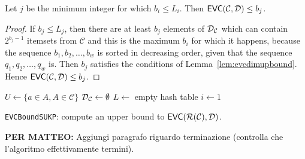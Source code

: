 \begin{lemma}\label{lem:sukpevc}
  Let $j$ be the minimum integer for which $b_i\le L_i$. Then
  $\mathsf{EVC}(\mathcal{C},{\cal D})\le b_j$.
\end{lemma}
\begin{proof}
  If $b_j\le L_j$, then there are at least $b_j$ elements of ${\cal D}_\mathcal{C}$
  which can contain $2^{b_j-1}$ itemsets from $\mathcal{C}$ and this is the
  maximum $b_i$ for which it happens, because the sequence $b_1,b_2,\dotsc,b_w$
  is sorted in decreasing order, given that the sequence $q_1,q_2,\dotsc,q_w$
  is. Then $b_j$ satisfies the conditions of Lemma~\ref{lem:evcdimupbound}.
  Hence $\mathsf{EVC}(\mathcal{C},{\cal D})\le b_j$.
\end{proof}

\begin{algorithm}[htbp]
  \DontPrintSemicolon
  $U\leftarrow\{a\in A, A\in\mathcal{C}\}$\;
  ${\cal D}_\mathcal{C}\leftarrow\emptyset$\;
  $L\leftarrow$ empty hash table\;
  $i\leftarrow 1$\;
  \caption{\texttt{EVCBoundSUKP}: compute an upper bound to
  $\mathsf{EVC}(\mathcal{R}(\mathcal{C}),{\cal D})$.}
  \label{alg:evcboundsukp}
\end{algorithm}

{\bf PER MATTEO:} Aggiungi paragrafo riguardo terminazione (controlla che
l'algoritmo effettivamente termini).


